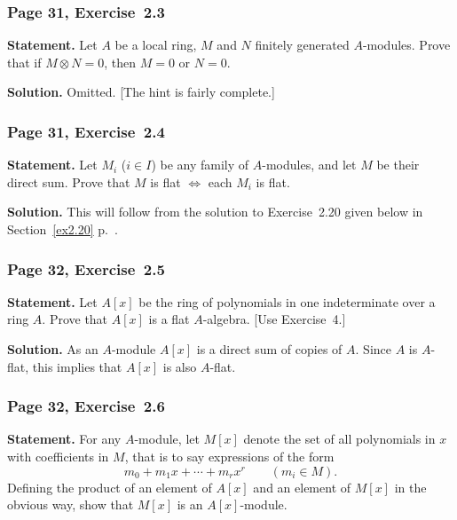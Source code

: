 \documentclass[12pt,letterpaper]{article}%
\newcommand{\mf}{\mathfrak}
\newcommand{\mmm}{\mf m}
\newcommand{\nn}{\noindent}
\begin{document}
\subsubsection{Page 31, Exercise~2.3}\label{ex2.3}%

\textbf{Statement.} Let $A$ be a local ring, $M$ and $N$ finitely generated $A$-modules. Prove that if $M\otimes N=0$, then $M=0$ or $N=0$.

\nn[Let $\mmm$ be the maximal ideal, $k=A/\mmm$ the residue field. Let $M_k=k\otimes_AM$ $\simeq$ $M/\mmm M$ by Exercise~2. By Nakayama's lemma (Proposition~\ref{nak} p.~\pageref{nak}), $M_k=0$ $\implies$ $ M=0$. But $M\otimes_AN=0$ $\implies$ $(M\otimes_AN)_k=0$ $\implies$ $M_k\otimes_k N_k=0$ $\implies$ $M_k=0$ or $N_k=0$, since $M_k,N_k$ are vector spaces over a field.]

\nn\textbf{Solution.} Omitted. [The hint is fairly complete.]

\subsubsection{Page 31, Exercise~2.4}%

\textbf{Statement.} Let $M_i$ ($i\in I$) be any family of $A$-modules, and let $M$ be their direct sum. Prove that $M$ is flat $\iff$ each $M_i$ is flat.

\nn\textbf{Solution.} This will follow from the solution to Exercise~2.20 given below in Section~\ref{ex2.20} p.~\pageref{ex2.20}.

\subsubsection{Page 32, Exercise~2.5}%

\textbf{Statement.} Let $A[x]$ be the ring of polynomials in one indeterminate over a ring $A$. Prove that $A[x]$ is a flat $A$-algebra. [Use Exercise~4.]

\nn\textbf{Solution.} As an $A$-module $A[x]$ is a direct sum of copies of $A$. Since $A$ is $A$-flat, this implies that $A[x]$ is also $A$-flat.%

\subsubsection{Page 32, Exercise~2.6}%

\textbf{Statement.} For any $A$-module, let $M[x]$ denote the set of all polynomials in $x$ with coefficients in $M$, that is to say expressions of the form 
$$
m_0+m_1x+\cdots+m_rx^r\qquad(m_i\in M).
$$
Defining the product of an element of $A[x]$ and an element of $M[x]$ in the obvious way, show that $M[x]$ is an $A[x]$-module.
\end{document}
